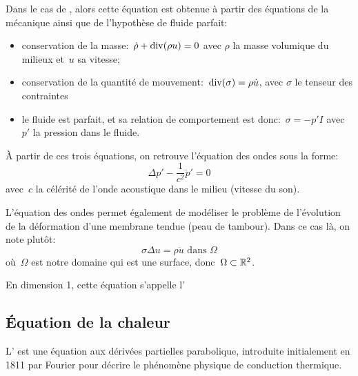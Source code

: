 \medskip
Dans le cas de , alors cette équation est obtenue à partir des équations de la mécanique ainsi que de l'hypothèse de fluide parfait:
\begin{itemize}
  \item conservation de la masse:~$\dot{\rho}+\operatorname{div}(\rho u)=0$ avec 
	$\rho$ la masse volumique du milieux et~$u$ sa vitesse;
  \item conservation de la quantité de mouvement:~$\operatorname{div}(\sigma)=\rho\dot{u}$, avec
	$\sigma$ le tenseur des contraintes
  \item le fluide est parfait, et sa relation de comportement est donc:~$\sigma=-p'I$ avec
	$p'$ la pression dans le fluide.
\end{itemize}
\medskipvm
À partir de ces trois équations, on retrouve l'équation des ondes sous la forme:
\begin{equation}
\Delta p' - \dfrac1{c^2} \ddot{p}' = 0
\end{equation}
avec~$c$ la célérité de l'onde acoustique dans le milieu (vitesse du son).

\medskip
L'équation des ondes permet également de modéliser le problème de l'évolution de la déformation d'une membrane tendue (peau de tambour). Dans ce cas là, on note plutôt:
\begin{equation}
 \sigma \Delta u = \rho\ddot{u} \text{ dans }\Omega
\end{equation}
où~$\Omega$ est notre domaine qui est une surface, donc~$\Omega\subset\mathbb R^2$.

 En dimension 1, cette équation s'appelle l'


\medskip
\subsection{Équation de la chaleur}

L' est une équation aux dérivées partielles parabolique, introduite initialement en 1811 par Fourier pour décrire le phénomène physique de conduction thermique.

